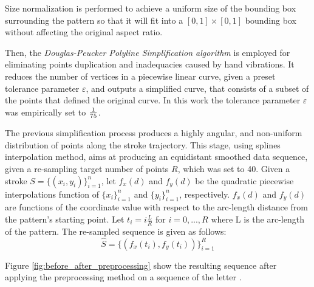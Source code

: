 \documentclass[10pt, conference, compsocconf]{IEEEtran}
\begin{document}
Size normalization is performed to achieve a uniform size of the bounding box surrounding the pattern so that it will fit into a $[0,1]\times[0,1]$ bounding box without affecting the original aspect ratio. 

Then, the \emph{Douglas-Peucker Polyline Simplification algorithm} \cite{douglas1973algorithms} is employed for eliminating points duplication and inadequacies caused by hand vibrations. 
It reduces the number of vertices in a piecewise linear curve, given a preset tolerance parameter $\varepsilon$, and outputs a simplified curve, that consists of a subset of the points that defined the original curve.
In this work the tolerance parameter $\varepsilon$ was empirically set to ${1 \over 75}$.

The previous simplification process produces a highly angular, and non-uniform distribution of points along the stroke trajectory.
This stage, using splines interpolation method, aims at producing an equidistant smoothed data sequence, given a re-sampling target number of points $R$, which was set to 40. 
Given a stroke $S=\{(x_i,y_i)\}_{i=1}^{n}$, let $f_{x}(d)$ and $f_{y}(d)$ be the quadratic piecewise interpolations function of $\{x_i\}_{i=1}^{n}$ and $\{y_i\}_{i=1}^{n}$, respectively. 
$f_{x}(d)$ and $f_{y}(d)$ are functions of the coordinate value with respect to the arc-length distance from the pattern's starting point. 
Let $t_i=i\frac{L}{R}$ for $i=0,...,R$ where L is the arc-length of the pattern.
The re-sampled sequence is given as follows:
\begin{equation}
\widehat{S}=\{(f_x(t_i),f_y(t_i))\}_{i=1}^{R}
\end{equation}

Figure \ref{fig:before_after_preprocessing} show the resulting sequence after applying the preprocessing method on a sequence of the letter . 
\end{document}
